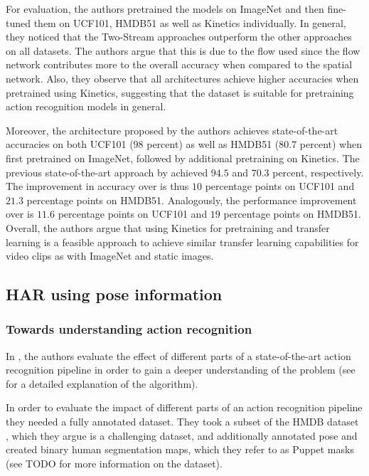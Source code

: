 For evaluation, the authors pretrained the models on ImageNet and then fine-tuned them on UCF101, HMDB51 as well as Kinetics individually.
In general, they noticed that the Two-Stream approaches outperform the other approaches on all datasets.
The authors argue that this is due to the flow used since the flow network contributes more to the overall accuracy when compared to the spatial network.
Also, they observe that all architectures achieve higher accuracies when pretrained using Kinetics, suggesting that the dataset is suitable for pretraining action recognition models in general.

Moreover, the architecture proposed by the authors achieves state-of-the-art accuracies on both UCF101 ($98$ percent) as well as HMDB51 ($80.7$ percent) when first pretrained on ImageNet, followed by additional pretraining on Kinetics.
The previous state-of-the-art approach by \cite{feichtenhofer_spatiotemporal_2016} achieved $94.5$ and $70.3$ percent, respectively.
The improvement in accuracy over \cite{simonyan_two-stream_2014} is thus $10$ percentage points on UCF101 and $21.3$ percentage points on HMDB51.
Analogously, the performance improvement over \cite{wang_action_2013} is $11.6$ percentage points on UCF101 and $19$ percentage points on HMDB51.
Overall, the authors argue that using Kinetics for pretraining and transfer learning is a feasible approach to achieve similar transfer learning capabilities for video clips as with ImageNet and static images.

\subsection{HAR using pose information}
\label{sec:jhuang-towards}
\subsubsection{Towards understanding action recognition}
In \cite{jhuang_towards_2013}, the authors evaluate the effect of different parts of a state-of-the-art action recognition pipeline \cite{wang_dense_2013} in order to gain a deeper understanding of the problem (see  for a detailed explanation of the algorithm).

In order to evaluate the impact of different parts of an action recognition pipeline they needed a fully annotated dataset.
They took a subset of the HMDB dataset \cite{kuehne_hmdb:_2011}, which they argue is a challenging dataset, and additionally annotated pose and created binary human segmentation maps, which they refer to as Puppet masks (see TODO for more information on the dataset). %


